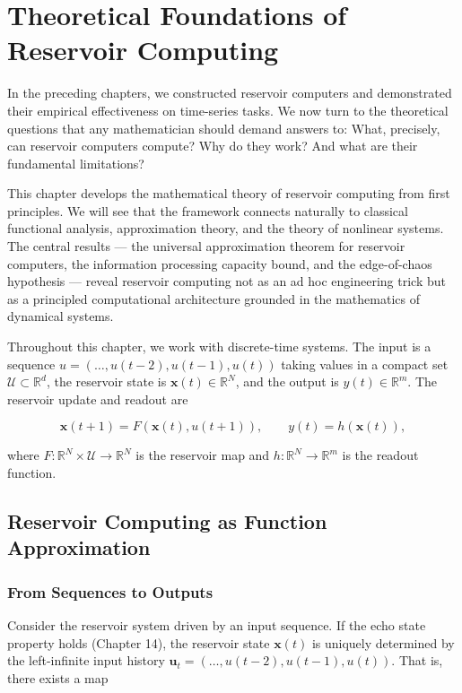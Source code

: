 \chapter{Theoretical Foundations of Reservoir Computing}\label{ch:15}

In the preceding chapters, we constructed reservoir computers and demonstrated their
empirical effectiveness on time-series tasks. We now turn to the theoretical questions
that any mathematician should demand answers to: What, precisely, can reservoir
computers compute? Why do they work? And what are their fundamental limitations?

This chapter develops the mathematical theory of reservoir computing from first
principles. We will see that the framework connects naturally to classical functional
analysis, approximation theory, and the theory of nonlinear systems. The central
results --- the universal approximation theorem for reservoir computers, the information
processing capacity bound, and the edge-of-chaos hypothesis --- reveal reservoir
computing not as an ad hoc engineering trick but as a principled computational
architecture grounded in the mathematics of dynamical systems.

Throughout this chapter, we work with discrete-time systems. The input is a
sequence $u = (\ldots, u(t-2), u(t-1), u(t))$ taking values in a compact set
$\mathcal{U} \subset \mathbb{R}^d$, the reservoir state is $\mathbf{x}(t) \in \mathbb{R}^N$,
and the output is $y(t) \in \mathbb{R}^m$. The reservoir update and readout are

\[
\mathbf{x}(t+1) = F(\mathbf{x}(t), u(t+1)), \qquad y(t) = h(\mathbf{x}(t)),
\]

where $F: \mathbb{R}^N \times \mathcal{U} \to \mathbb{R}^N$ is the reservoir map and
$h: \mathbb{R}^N \to \mathbb{R}^m$ is the readout function.


\bigskip


\section{Reservoir Computing as Function Approximation}\label{sec:15.1}

\subsection{From Sequences to Outputs}\label{sec:15.1.1}

Consider the reservoir system driven by an input sequence. If the echo state property
holds (Chapter 14), the reservoir state $\mathbf{x}(t)$ is uniquely determined by the
left-infinite input history $\mathbf{u}_t = (\ldots, u(t-2), u(t-1), u(t))$. That is,
there exists a map

